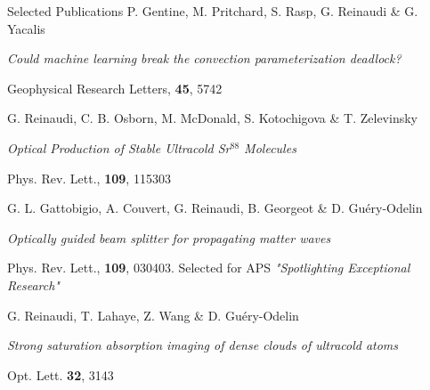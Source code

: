 \begin{rubric}{Selected Publications}
\entry*[2018]%
P. Gentine, M. Pritchard, S. Rasp, G. Reinaudi \& G. Yacalis
\par{\emph{Could machine learning break the convection parameterization deadlock?}
\par{Geophysical Research Letters, \textbf{45}, 5742}}
%
\entry*[2012]%
G. Reinaudi, C. B. Osborn, M. McDonald, S. Kotochigova \& T. Zelevinsky
\par{\emph{Optical Production of Stable Ultracold Sr$^{88}$ Molecules}
\par{Phys. Rev. Lett., \textbf{109}, 115303}}
%
\entry*[2012]%
G. L. Gattobigio, A. Couvert, G. Reinaudi, B. Georgeot \& D. Gu\'ery-Odelin
\par{\emph{Optically guided beam splitter for propagating matter waves}
\par{Phys. Rev. Lett., \textbf{109}, 030403. Selected for APS \textit{"Spotlighting Exceptional Research"}}}
%
\entry*[2007]%
G. Reinaudi, T. Lahaye, Z. Wang \& D. Gu\'ery-Odelin
\par{\emph{Strong saturation absorption imaging of dense clouds of ultracold atoms}
\par{Opt. Lett. \textbf{32}, 3143}}
\end{rubric}
